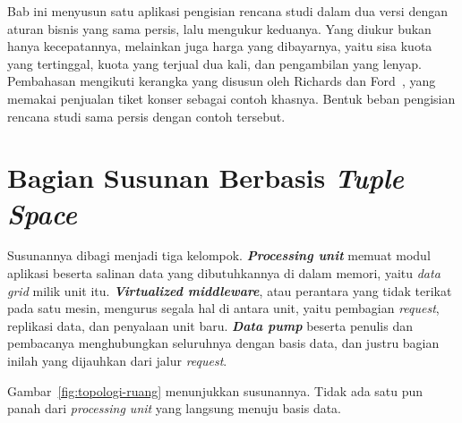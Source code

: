 Bab ini menyusun satu aplikasi pengisian rencana studi dalam dua versi dengan
aturan bisnis yang sama persis, lalu mengukur keduanya. Yang diukur bukan hanya
kecepatannya, melainkan juga harga yang dibayarnya, yaitu sisa kuota yang
tertinggal, kuota yang terjual dua kali, dan pengambilan yang lenyap.
Pembahasan mengikuti kerangka yang disusun oleh Richards dan
Ford~\cite{richards2020fundamentals}, yang memakai penjualan tiket konser
sebagai contoh khasnya. Bentuk beban pengisian rencana studi sama persis
dengan contoh tersebut.

\section{Bagian Susunan Berbasis \textit{Tuple Space}}

Susunannya dibagi menjadi tiga kelompok. \textbf{\textit{Processing unit}}
memuat modul aplikasi beserta salinan data yang dibutuhkannya di dalam memori,
yaitu \textit{data grid} milik unit itu.
\textbf{\textit{Virtualized
middleware}}, atau perantara yang tidak terikat pada satu mesin, mengurus
segala hal di antara unit, yaitu pembagian \textit{request}, replikasi data,
dan penyalaan unit baru. \textbf{\textit{Data pump}}
beserta penulis dan
pembacanya menghubungkan seluruhnya dengan basis data, dan justru bagian inilah
yang dijauhkan dari jalur \textit{request}.

Gambar~\ref{fig:topologi-ruang} menunjukkan susunannya. Tidak ada satu pun
panah dari \textit{processing unit} yang langsung menuju basis data.

